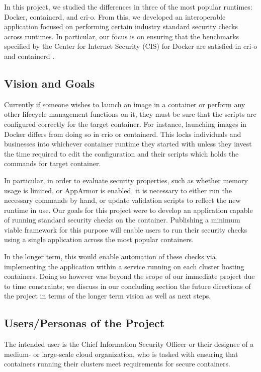 In this project, we studied the differences in three of the most popular runtimes: Docker, containerd, and cri-o. From this, we developed an interoperable application focused on performing certain industry standard security checks across runtimes. In particular, our focus is on ensuring that the benchmarks specified by the Center for Internet Security (CIS) for Docker are satisfied in cri-o and containerd \cite{center_for_internet_security}.

\subsection*{Vision and Goals}


Currently if someone wishes to launch an image in a container or perform any other lifecycle management functions on it, they must be sure that the scripts are configured correctly for the target container. For instance, launching images in Docker differs from doing so in crio or containerd. This locks individuals and businesses into whichever container runtime they started with unless they invest the time required to edit the configuration and their scripts which holds the commands for target container.

In particular, in order to evaluate security properties, such as whether memory usage is limited, or AppArmor is enabled, it is necessary to either run the necessary commands by hand, or update validation scripts to reflect the new runtime in use. Our goals for this project were to develop an application capable of running standard security checks \cite[Ch.5]{center_for_internet_security} on the container. Publishing a minimum viable framework for this purpose will enable users to run their security checks using a single application across the most popular containers. 

In the longer term, this would enable automation of these checks via implementing the application within a service running on each cluster hosting containers. Doing so however was beyond the scope of our immediate project due to time constraints; we discuss in our concluding section the future directions of the project in terms of the longer term vision as well as next steps. 

\subsection*{Users/Personas of the Project}


The intended user is the Chief Information Security Officer or their designee of a medium- or large-scale cloud organization, who is tasked with ensuring that containers running their clusters meet requirements for secure containers. 


